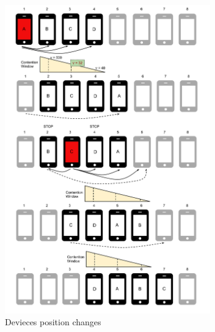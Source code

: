 \begin{figure}[htbp]
\centering
\includegraphics[trim = 10mm 15mm 10mm 10mm ,width=3.5in]{imgs/Positions_1.pdf}
\caption{Devieces position changes}
\label{fig:positions}
\end{figure}
